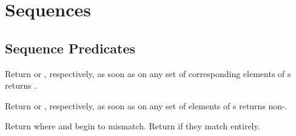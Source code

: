 %
%

\section{Sequences} 
\label{section:Sequences}

\subsection[Seq.~Predicates]{Sequence Predicates} 
\begin{LIST}{1cm}

  {
  Return \retval{\NIL} or \retval{\T}, respectively, as soon as  on
  any set of corresponding elements of s returns \NIL. 
  }

  {
  Return  or \retval{\NIL}, respectively, as soon
  as  on any set of elements of s returns non-\NIL. 
  }

  {
  Return  where
   and  begin to
  mismatch. Return \retval{\NIL} if
  they match entirely.
  }

\end{LIST}

